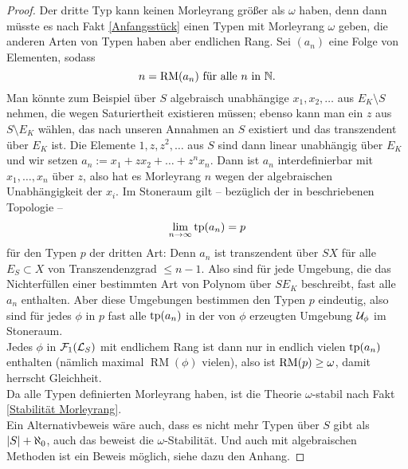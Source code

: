 \begin{proof}
        Der dritte Typ kann keinen Morleyrang größer als $\omega$ haben, denn dann müsste es nach Fakt \ref{Anfangsstück} einen Typen mit Morleyrang $\omega$ geben, die anderen Arten von Typen haben aber endlichen Rang. Sei $(a_n)$ eine Folge von Elementen, sodass $$n=\operatorname{RM}(a_n)\text{ für alle }n\text{ in }\mathbb{N}.$$ Man könnte zum Beispiel über $S$ algebraisch unabhängige $x_1,x_2,\dots$ aus $E_K\setminus S$ nehmen, die wegen Saturiertheit existieren müssen; ebenso kann man ein $z$ aus $S\setminus E_K$ wählen, das nach unseren Annahmen an $S$ existiert und das transzendent über $E_K$ ist. Die Elemente $1,z,z^2,\dots$ aus $S$ sind dann linear unabhängig über $E_K$ und wir setzen $a_n:=x_1+zx_2+\dots+z^nx_n$. Dann ist $a_n$ interdefinierbar mit $x_1,\dots,x_n$ über $z$, also hat es Morleyrang $n$ wegen der algebraischen Unabhängigkeit der $x_i$.\newpage
        Im Stoneraum gilt \--- bezüglich der in \cite{Lukas} beschriebenen Topologie \--- $$\lim\limits_{n\rightarrow\infty}\operatorname{tp}(a_n)=p$$ für den Typen $p$ der dritten Art: Denn $a_n$ ist transzendent über $SX$ für alle $E_S\subset X$ von Transzendenzgrad $\leq n-1$. Also sind für jede Umgebung, die das Nichterfüllen einer bestimmten Art von Polynom über $SE_K$ beschreibt, fast alle $a_n$ enthalten. Aber diese Umgebungen bestimmen den Typen $p$ eindeutig, also sind für jedes $\phi$ in $p$ fast alle $\operatorname{tp}(a_n)$ in der von $\phi$ erzeugten Umgebung $\mathcal{U}_\phi$ im Stoneraum.\\
        Jedes $\phi$ in $\mathcal{F}_1(\mathcal{L}_S)$ mit endlichem Rang ist dann nur in endlich vielen $\operatorname{tp}(a_n)$ enthalten (nämlich maximal $\operatorname{RM}(\phi)$ vielen), also ist $\operatorname{RM}(p)\geq\omega$, damit herrscht Gleichheit.\\
        Da alle Typen definierten Morleyrang haben, ist die Theorie $\omega$-stabil  nach Fakt \ref{Stabilität Morleyrang}.\\
        Ein Alternativbeweis wäre auch, dass es nicht mehr Typen über $S$ gibt als ${\left| S \right|}+\aleph_0$, auch das beweist die $\omega$-Stabilität. Und auch mit algebraischen Methoden ist ein Beweis möglich, siehe dazu den Anhang.
    \end{proof}